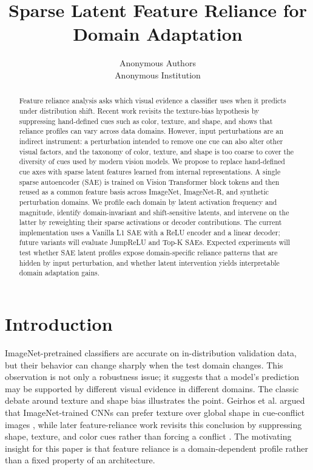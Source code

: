 \documentclass{article}
\title{Sparse Latent Feature Reliance for Domain Adaptation}
\author{
    Anonymous Authors\\
    Anonymous Institution
}
\begin{document}
\maketitle

\begin{abstract}
Feature reliance analysis asks which visual evidence a classifier uses when it predicts under distribution shift. Recent work revisits the texture-bias hypothesis by suppressing hand-defined cues such as color, texture, and shape, and shows that reliance profiles can vary across data domains. However, input perturbations are an indirect instrument: a perturbation intended to remove one cue can also alter other visual factors, and the taxonomy of color, texture, and shape is too coarse to cover the diversity of cues used by modern vision models. We propose to replace hand-defined cue axes with sparse latent features learned from internal representations. A single sparse autoencoder (SAE) is trained on Vision Transformer block tokens and then reused as a common feature basis across ImageNet, ImageNet-R, and synthetic perturbation domains. We profile each domain by latent activation frequency and magnitude, identify domain-invariant and shift-sensitive latents, and intervene on the latter by reweighting their sparse activations or decoder contributions. The current implementation uses a Vanilla L1 SAE with a ReLU encoder and a linear decoder; future variants will evaluate JumpReLU and Top-K SAEs. Expected experiments will test whether SAE latent profiles expose domain-specific reliance patterns that are hidden by input perturbation, and whether latent intervention yields interpretable domain adaptation gains.
\end{abstract}

\section{Introduction}

ImageNet-pretrained classifiers are accurate on in-distribution validation data, but their behavior can change sharply when the test domain changes. This observation is not only a robustness issue; it suggests that a model's prediction may be supported by different visual evidence in different domains. The classic debate around texture and shape bias illustrates the point. Geirhos et al. argued that ImageNet-trained CNNs can prefer texture over global shape in cue-conflict images \cite{geirhos2019imagenet}, while later feature-reliance work revisits this conclusion by suppressing shape, texture, and color cues rather than forcing a conflict \cite{imagenetnottexture2025}. The motivating insight for this paper is that feature reliance is a domain-dependent profile rather than a fixed property of an architecture.
\end{document}
